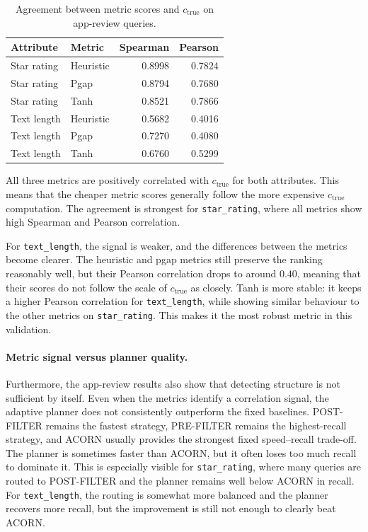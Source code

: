 \begin{table}[H]
    \centering
    \renewcommand{\arraystretch}{1.12}
    \begin{tabular}{llrr}
        \toprule
        Attribute & Metric & Spearman & Pearson \\
        \midrule
        Star rating & Heuristic & 0.8998 & 0.7824 \\
        Star rating & Pgap      & 0.8794 & 0.7680 \\
        Star rating & Tanh      & 0.8521 & 0.7866 \\
        \midrule
        Text length & Heuristic & 0.5682 & 0.4016 \\
        Text length & Pgap      & 0.7270 & 0.4080 \\
        Text length & Tanh      & 0.6760 & 0.5299 \\
        \bottomrule
    \end{tabular}
    \caption{Agreement between metric scores and \(c_{\mathrm{true}}\) on app-review queries.}
    \label{tab:app-review-validation}
\end{table}

All three metrics are positively correlated with \(c_{\mathrm{true}}\) for both attributes.
This means that the cheaper metric scores generally follow the more expensive \(c_{\mathrm{true}}\) computation.
The agreement is strongest for \texttt{star\_rating}, where all metrics show high Spearman and Pearson correlation.

For \texttt{text\_length}, the signal is weaker, and the differences between the metrics become clearer.
The heuristic and pgap metrics still preserve the ranking reasonably well, but their Pearson correlation drops to around \(0.40\), meaning that their scores do not follow the scale of \(c_{\mathrm{true}}\) as closely.
Tanh is more stable: it keeps a higher Pearson correlation for \texttt{text\_length}, while showing similar behaviour to the other metrics on \texttt{star\_rating}.
This makes it the most robust metric in this validation.

\paragraph{Metric signal versus planner quality.}

Furthermore, the app-review results also show that detecting structure is not sufficient by itself.
Even when the metrics identify a correlation signal, the adaptive planner does not consistently outperform the fixed baselines.
POST-FILTER remains the fastest strategy, PRE-FILTER remains the highest-recall strategy, and ACORN usually provides the strongest fixed speed--recall trade-off.
The planner is sometimes faster than ACORN, but it often loses too much recall to dominate it.
This is especially visible for \texttt{star\_rating}, where many queries are routed to POST-FILTER and the planner remains well below ACORN in recall.
For \texttt{text\_length}, the routing is somewhat more balanced and the planner recovers more recall, but the improvement is still not enough to clearly beat ACORN.

